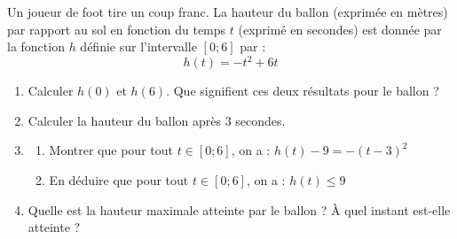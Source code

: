 


\begin{Activite}[][5 min]
Un joueur de foot tire un coup franc. La hauteur du ballon (exprimée en mètres) par rapport au sol en fonction du temps $t$ (exprimé en secondes) est donnée par la fonction $h$ définie sur l'intervalle $[0; 6]$ par :
$$h(t) = -t^2 + 6t$$

\begin{enumerate}
    \item Calculer $h(0)$ et $h(6)$. Que signifient ces deux résultats pour le ballon ?
    \item Calculer la hauteur du ballon après $3$ secondes.
    \item 
    \begin{enumerate}
    \item Montrer que pour tout $t \in [0; 6]$, on a : $h(t) - 9 = -(t - 3)^2$
    \item En déduire que pour tout $t \in [0; 6]$, on a : $h(t) \leq 9$
    \end{enumerate}
    \item Quelle est la hauteur maximale atteinte par le ballon ? À quel instant est-elle atteinte ?
\end{enumerate}

\end{Activite}